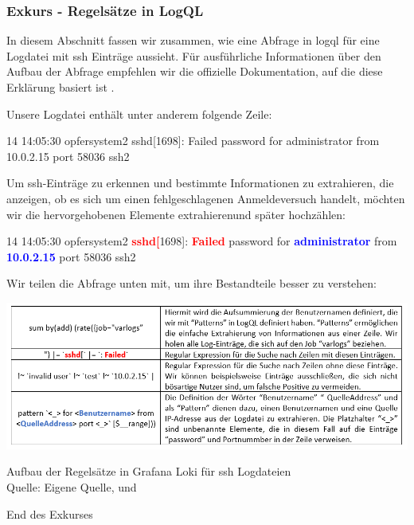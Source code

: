 \newpage
{
\begin{framed}
   \subsubsection{Exkurs - Regelsätze in LogQL}
   In diesem Abschnitt fassen wir zusammen, wie eine Abfrage in \gls{logql} für eine Logdatei mit \gls{ssh} Einträge aussieht. Für ausführliche Informationen über den Aufbau der Abfrage empfehlen wir die offizielle Dokumentation, auf die diese Erklärung basiert ist \citep{Grafana_logql}.

   Unsere Logdatei enthält unter anderem folgende Zeile:

   14 14:05:30 opfersystem2 sshd[1698]: Failed password for administrator from 10.0.2.15 port 58036 ssh2

   Um \gls{ssh}-Einträge zu erkennen und bestimmte Informationen zu extrahieren, die anzeigen, ob es sich um einen fehlgeschlagenen Anmeldeversuch handelt, möchten wir die hervorgehobenen Elemente extrahierenund später hochzählen:

   14 14:05:30 opfersystem2 \textbf{\textcolor{red}{sshd[}}1698]: \textbf{\textcolor{red}{Failed}} password for \textbf{\textcolor{blue}{administrator}} from \textbf{\textcolor{blue}{10.0.2.15}} port    58036 ssh2

   Wir teilen die Abfrage unten mit, um ihre Bestandteile besser zu verstehen: 

   \begin{table}[H]
      \includegraphics[width=\linewidth]{assets/tabelle_logql.png}
      \caption{Aufbau der Regelsätze in Grafana Loki für \gls{ssh} Logdateien \\Quelle: Eigene Quelle, \citep{VoidQuark_sshlogs} und \citep{Grafana_logql}}
   \end{table}

   \begin{center}
   End des Exkurses
   \end{center}
\end{framed}
}

